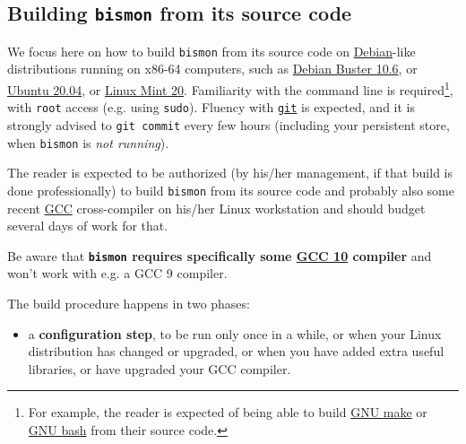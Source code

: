 

\begin{appendices}


\section{Building \texttt{bismon} from its source code}
\label{sec:building-bismon}

We focus here on how to build \texttt{bismon} from its source code on
\href{http://debian.org/}{Debian}-like distributions running on x86-64
computers, such as
\href{https://www.debian.org/releases/stable/}{Debian Buster 10.6}, or
\href{https://ubuntu.com/}{Ubuntu 20.04}, or
\href{https://linuxmint.com/}{Linux Mint 20}. Familiarity with the
command line is required\footnote{For example, the reader is expected
  of being able to build \href{https://www.gnu.org/software/make/}{GNU
    make} or \href{https://www.gnu.org/software/bash/}{GNU bash} from
  their source code.}, with \texttt{root} access (e.g. using
\texttt{sudo}). Fluency with \href{https://git-scm.com/}{\texttt{git}}
is expected, and it is strongly advised to \texttt{git commit} every
few hours (including your persistent store, when \texttt{bismon} is
\emph{not running}).

The reader is expected to be authorized (by his/her management, if
that build is done professionally) to build \texttt{bismon} from its
source code and probably also some recent
\href{https://gcc.gnu.org/}{GCC} cross-compiler on his/her Linux workstation
and should budget several days of work for that.


{\large Be aware that \textbf{\texttt{bismon} requires specifically some
  \href{https://gcc.gnu.org/gcc-10/}{GCC 10} compiler} and won't work
  with e.g. a GCC 9 compiler.}


\medskip

The build procedure happens in two phases:

\begin{itemize}

\item a \textbf{configuration step}, to be run only once in a while,
  or when your Linux distribution has changed or upgraded, or when you
  have added extra useful libraries, or have upgraded your GCC
  compiler.


\end{itemize}
\end{appendices}
